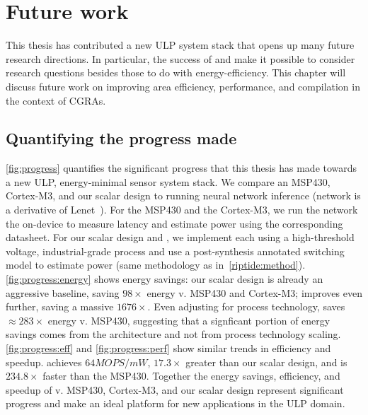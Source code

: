 \chapter{Future work}
\label{chapter:future}
This thesis has contributed a new ULP system stack that opens up many future research directions.
% 
In particular, the success of \snafu and \riptide make it possible to consider research questions besides those to do with energy-efficiency.
% 
This chapter will discuss future work on improving area efficiency, performance, and compilation in the context of CGRAs.

\figProgress
\section{Quantifying the progress made}
\autoref{fig:progress} quantifies the significant progress that this thesis has made towards a new ULP, energy-minimal sensor system stack.
%
We compare an MSP430, Cortex-M3, and our scalar design to \riptide running neural network inference (network is a derivative of Lenet~\cite{lecun:ieee89:lenet}).
% 
For the MSP430 and the Cortex-M3, we run the network the on-device to measure latency and estimate power using the corresponding datasheet. 
% 
For our scalar design and \riptide, we implement each using a high-threshold voltage, industrial-grade process and use a post-synthesis annotated switching model to estimate power (same methodology as in~\autoref{riptide:method}).
% 
\autoref{fig:progress:energy} shows energy savings: our scalar design is already an aggressive baseline, saving $98\times$ energy v. MSP430 and Cortex-M3; \riptide improves even further, saving a massive $1676\times$.
% 
Even adjusting for process technology, \riptide saves $\approx 283 \times$ energy v. MSP430, suggesting that a signficant portion of energy savings comes from the architecture and not from process technology scaling.
% 
\autoref{fig:progress:eff} and \autoref{fig:progress:perf} show similar trends in efficiency and speedup.
% 
\riptide achieves $64MOPS/mW$, $17.3\times$ greater than our scalar design, and 
is $234.8\times$ faster than the MSP430.
% 
Together the energy savings, efficiency, and speedup of \riptide v. MSP430, Cortex-M3, and our scalar design represent significant progress and make \riptide an ideal platform for new applications in the ULP domain.

\figFutureModel
